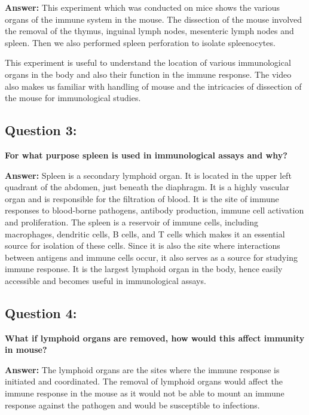 \documentclass{article}
\begin{document}
\textbf{Answer:}  This experiment which was conducted on mice shows the various organs of the immune system in the mouse.
 The dissection of the mouse involved the removal of the thymus, inguinal lymph nodes, mesenteric lymph nodes and spleen. 
 Then we also performed spleen perforation to isolate spleenocytes.

    This experiment is useful to understand the location of various immunological organs in the body and also their function in the immune response.
    The video also makes us familiar with handling of mouse and the intricacies of dissection of the mouse for immunological studies.




\subsection*{Question 3:} \textbf{For what purpose spleen is used in immunological assays and why?}

\textbf{Answer:} Spleen is a secondary lymphoid organ.  It is located in the upper left quadrant of the abdomen,
  just beneath the diaphragm. It is a highly vascular organ and is responsible for the filtration of blood. 
  It is the site of immune responses to blood-borne pathogens, antibody production, immune cell activation and proliferation. The spleen is a reservoir of immune cells, including macrophages, dendritic cells, 
  B cells, and T cells which makes it an essential source for isolation of these cells.
  Since it is also the site where interactions between antigens and immune cells occur, it also serves as a source for studying immune response.
  It is the largest lymphoid organ in the body, hence easily accessible and becomes useful in immunological assays.
  




\subsection*{Question 4:} \textbf{What if lymphoid organs are removed, how would this affect immunity in mouse?}

\textbf{Answer:}  The lymphoid organs are the sites where the immune response is initiated and coordinated.
  The removal of lymphoid organs would affect the immune response in the mouse as it would not be able to mount
  an immune response against the pathogen and would be susceptible to infections.
  
\end{document}
